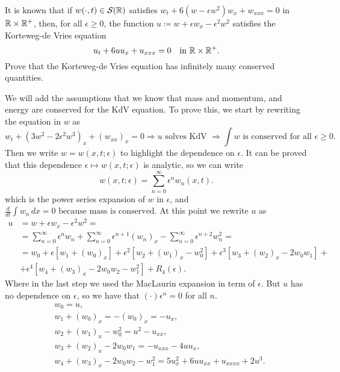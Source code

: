\newpage
\begin{exercise}
    It is known that if \(w(\cdot, t) \in \mathcal{S}(\mathbb{R})\) satisfies \(w_t + 6(w - \epsilon w^2)w_x + w_{xxx} = 0\) in \(\mathbb{R} \times \mathbb{R}^+\), then, for all \(\epsilon \geq 0\),
    the function \(u \coloneqq w + \epsilon w_x - \epsilon^2 w^2\) satisfies the Korteweg-de Vries equation
    \[
        u_t + 6uu_x + u_{xxx} = 0 \quad \text{in } \mathbb{R} \times \mathbb{R}^+.
    \]
    Prove that the Korteweg-de Vries equation has infinitely many conserved
    quantities.
\end{exercise}
We will add the assumptions that we know that mass and momentum, and energy are conserved for the KdV equation.
To prove this, we start by rewriting the equation in \(w\) as
\[
    w_t + \left(3w^2 - 2\epsilon^2 w^3\right)_x + \left(w_{xx}\right)_x = 0 \Rightarrow u \text{ solves KdV } \Rightarrow \int w \text{ is conserved for all } \epsilon \geq 0.
\]
Then we write \(w = w(x, t; \epsilon)\) to highlight the dependence on
\(\epsilon\). It can be proved that this dependence \(\epsilon \mapsto w(x, t;
\epsilon)\) is analytic, so we can write
\[
    w(x, t; \epsilon) = \sum_{n=0}^\infty \epsilon^n w_n(x, t).
\]
which is the power series expansion of \(w\) in \(\epsilon\), and \(
\frac{d}{dt} \int w_n \, dx = 0 \text{ because mass is conserved.} \) At this
point we rewrite \(u\) as
\begin{align*}
    u & = w + \epsilon w_x - \epsilon^2 w^2 =                                                                                                            \\
      & = \sum_{n=0}^\infty \epsilon^n w_n + \sum_{n=0}^\infty \epsilon^{n+1} (w_{n})_x - \sum_{n=0}^\infty \epsilon^{n+2} w_n^2 =                       \\
      & = w_0 + \epsilon \left[w_1 + (w_0)_x\right] + \epsilon^2 \left[w_2 + (w_1)_x - w_0^2\right] + \epsilon^3 \left[w_3 + (w_2)_x - 2w_0 w_1\right] + \\
      & + \epsilon^4 \left[w_4 + (w_3)_x - 2w_0 w_2 - w_1^2\right] + R_4(\epsilon).
\end{align*}
Where in the last step we used the MacLaurin expansion in term of \(\epsilon\). But \(u\) has no dependence on \(\epsilon\), so we have that \((\cdot)\epsilon^n = 0\) for all \(n\).
\begin{align*}
     & w_0 = u,                                                                    \\
     & w_1 + (w_0)_x = -(w_0)_x = -u_x,                                            \\
     & w_2 + (w_1)_x - w_0^2 = u^2 - u_{xx},                                       \\
     & w_3 + (w_2)_x - 2w_0 w_1 = -u_{xxx} - 4uu_x,                                \\
     & w_4 + (w_3)_x - 2w_0 w_2 - w_1^2 = 5 u_x^2 + 6 u u_{xx} + u_{xxxx} + 2 u^3.
\end{align*}
